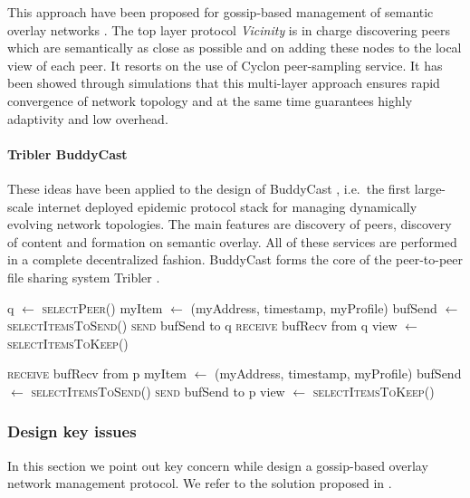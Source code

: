 This approach have been proposed for gossip-based management of semantic overlay networks \cite{VS05, VSI06}. The top layer protocol \textit{Vicinity} is in charge discovering peers which are semantically as close as possible and on adding these nodes to the local view of each peer. It resorts on the use of Cyclon peer-sampling service. It has been showed through simulations that this multi-layer approach ensures rapid convergence of network topology and at the same time guarantees highly adaptivity and low overhead.

\paragraph{Tribler BuddyCast} These ideas have been applied to the design of BuddyCast \cite{PYM+08}, i.e.\ the first large-scale internet deployed epidemic protocol stack for managing dynamically evolving network topologies. The main features are discovery of peers, discovery of content and formation on semantic overlay. All of these services are performed in a complete decentralized fashion. BuddyCast forms the core of the peer-to-peer file sharing system Tribler \cite{PGW+08}.

\begin{algorithm}[t]
\caption{Cyclon and Vicinity epidepic protocols skeleton}%
\begin{algorithmic}[1]

\State q $\gets$ \textsc{selectPeer}()
\State myItem $\gets$ (myAddress, timestamp, myProfile)
\State bufSend $\gets$ \textsc{selectItemsToSend}()
\State \textsc{send} bufSend to q
\State \textsc{receive} bufRecv from q
\State view $\gets$ \textsc{selectItemsToKeep}()

\EndProcedure

\Statex


\State \textsc{receive} bufRecv from p
\State myItem $\gets$ (myAddress, timestamp, myProfile)
\State bufSend $\gets$ \textsc{selectItemsToSend}()
\State \textsc{send} bufSend to p
\State view $\gets$ \textsc{selectItemsToKeep}()

\EndProcedure

\end{algorithmic}
\end{algorithm}

\subsubsection{Design key issues}
In this section we point out key concern while design a gossip-based overlay network management protocol. We refer to the solution proposed in \cite{VS05, VSI06}.

